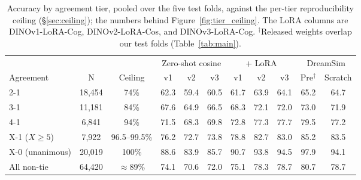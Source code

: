 \begin{table}[!ht]
\caption{Accuracy by agreement tier, pooled over the five test folds, against the per-tier reproducibility ceiling (\S\ref{sec:ceiling}); the numbers behind Figure~\ref{fig:tier_ceiling}. The LoRA columns are DINOv1-LoRA-Cog, DINOv2-LoRA-Cos, and DINOv3-LoRA-Cog. $^\dagger$Released weights overlap our test folds (Table~\ref{tab:main}).}
\label{tab:tiergap}
\centering
\footnotesize
\setlength{\tabcolsep}{4pt}
\begin{tabular}{lcc ccc ccc cc}
\toprule
 & & & \multicolumn{3}{c}{Zero-shot cosine} & \multicolumn{3}{c}{+ LoRA} & \multicolumn{2}{c}{DreamSim} \\
\cmidrule(lr){4-6}\cmidrule(lr){7-9}\cmidrule(lr){10-11}
Agreement & N & Ceiling & v1 & v2 & v3 & v1 & v2 & v3 & Pre$^\dagger$ & Scratch \\
\midrule
2-1 & 18{,}454 & 74\% & 62.3 & 59.4 & 60.5 & 61.7 & 63.9 & 64.1 & 65.2 & 64.7 \\
3-1 & 11{,}181 & 84\% & 67.6 & 64.9 & 66.5 & 68.3 & 72.1 & 72.0 & 73.0 & 71.9 \\
4-1 & 6{,}841 & 94\% & 71.5 & 68.3 & 69.8 & 72.8 & 77.3 & 77.7 & 79.5 & 77.2 \\
X-1 ($X \geq 5$) & 7{,}922 & 96.5--99.5\% & 76.2 & 72.7 & 73.8 & 78.8 & 82.7 & 83.0 & 85.2 & 83.5 \\
X-0 (unanimous) & 20{,}019 & 100\% & 88.6 & 83.9 & 85.7 & 90.7 & 93.8 & 94.5 & 97.9 & 94.1 \\
\midrule
All non-tie & 64{,}420 & $\approx$89\% & 74.1 & 70.6 & 72.0 & 75.1 & 78.3 & 78.7 & 80.7 & 78.7 \\
\bottomrule
\end{tabular}
\end{table}

